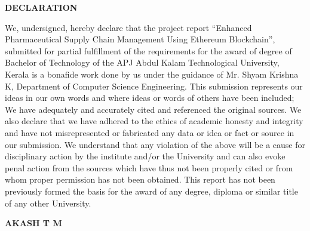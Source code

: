 \documentclass[12pt,a4paper]{report}
\begin{document}
\begin{titlepage}
\onehalfspacing
\begin{center}
{\fontsize{16}{10}\selectfont\textbf{DECLARATION}}\\

\end{center}


\onehalfspacing
We, undersigned, hereby declare that the project report “Enhanced Pharmaceutical Supply Chain Management Using Ethereum Blockchain”, submitted for
partial fulfillment of the requirements for the award of degree of Bachelor of
Technology of the APJ Abdul Kalam Technological University, Kerala is a bonafide
work done by us under the guidance of Mr. Shyam Krishna K, Department of Computer Science
Engineering. This submission represents our ideas in our own words and where ideas
or words of others have been included; We have adequately and accurately cited and
referenced the original sources. We also declare that we have adhered to the ethics of
academic honesty and integrity and have not misrepresented or fabricated any data or
idea or fact or source in our submission. We understand that any violation of the above
will be a cause for disciplinary action by the institute and/or the University and can
also evoke penal action from the sources which have thus not been properly cited or
from whom proper permission has not been obtained. This report has not been
previously formed the basis for the award of any degree, diploma or similar title of
any other University.

\begin{center}

 




\begin{flushright}

\singlespacing %
\textbf{AKASH T M} \\


\end{flushright}
\end{center}
\end{titlepage}
\end{document}
